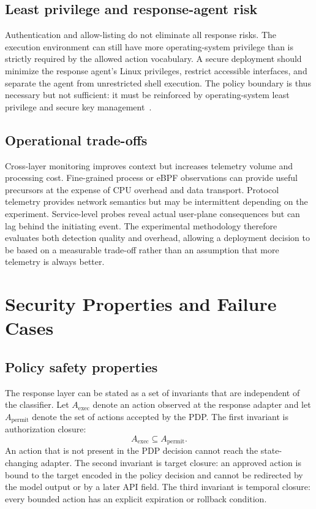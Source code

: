 \documentclass[sigconf,review]{acmart}
\begin{document}
\subsection{Least privilege and response-agent risk}
Authentication and allow-listing do not eliminate all response risks. The execution environment can still have more operating-system privilege than is strictly required by the allowed action vocabulary. A secure deployment should minimize the response agent's Linux privileges, restrict accessible interfaces, and separate the agent from unrestricted shell execution. The policy boundary is thus necessary but not sufficient: it must be reinforced by operating-system least privilege and secure key management~\cite{nistcontainer,nistzero}.

\subsection{Operational trade-offs}
Cross-layer monitoring improves context but increases telemetry volume and processing cost. Fine-grained process or eBPF observations can provide useful precursors at the expense of CPU overhead and data transport. Protocol telemetry provides network semantics but may be intermittent depending on the experiment. Service-level probes reveal actual user-plane consequences but can lag behind the initiating event. The experimental methodology therefore evaluates both detection quality and overhead, allowing a deployment decision to be based on a measurable trade-off rather than an assumption that more telemetry is always better.

\section{Security Properties and Failure Cases}
\subsection{Policy safety properties}
The response layer can be stated as a set of invariants that are independent of the classifier. Let $A_{\mathrm{exec}}$ denote an action observed at the response adapter and let $A_{\mathrm{permit}}$ denote the set of actions accepted by the PDP. The first invariant is authorization closure:
\begin{equation}
A_{\mathrm{exec}} \subseteq A_{\mathrm{permit}}.
\end{equation}
An action that is not present in the PDP decision cannot reach the state-changing adapter. The second invariant is target closure: an approved action is bound to the target encoded in the policy decision and cannot be redirected by the model output or by a later API field. The third invariant is temporal closure: every bounded action has an explicit expiration or rollback condition.
\end{document}
